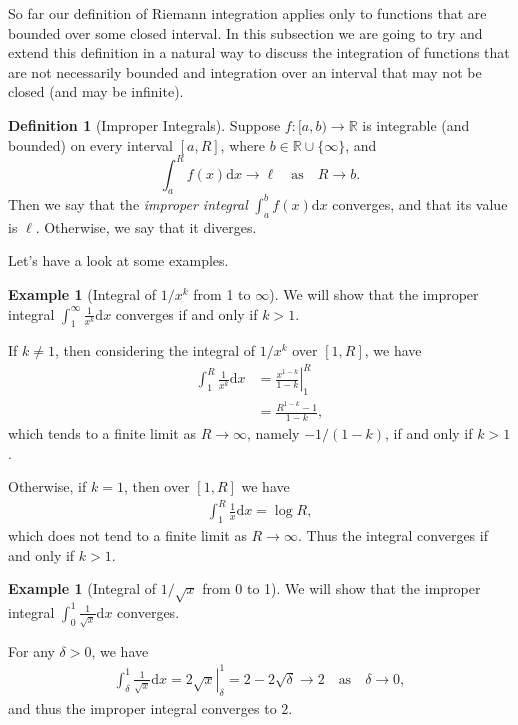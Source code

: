 \documentclass[11pt, a4paper]{article}
\theoremstyle{definition}
\newtheorem{definition}[theorem]{Definition}
\newtheorem{example}[theorem]{Example}
\newcommand{\vocab}[1]{\emph{#1}} %
\newcommand{\R}{\mathbb{R}}
\newcommand{\dd}{\mathrm{d}}
\begin{document}
So far our definition of Riemann integration applies only to functions that are bounded over some closed interval. In this subsection we are going to try and extend this definition in a natural way to discuss the integration of functions that are not necessarily bounded and integration over an interval that may not be closed (and may be infinite).

\begin{definition}[Improper Integrals]
	Suppose $f:[a, b) \rightarrow \R$ is integrable (and bounded) on every interval $[a, R]$, where $b \in \R \cup \{\infty\}$, and
	$$
	\int_a^R f(x) \dd x \rightarrow \ell \quad \text{as} \quad R \rightarrow b.
	$$
	Then we say that the \vocab{improper integral} $\int_a^{b} f(x) \dd x$ converges, and that its value is $\ell$. Otherwise, we say that it diverges. 
\end{definition}

Let's have a look at some examples.

\begin{example}[Integral of $1/x^k$ from 1 to $\infty$]
	We will show that the improper integral
	$
	\displaystyle\int_1^{\infty} \frac{1}{x^k} \dd x
	$
	converges if and only if $k > 1$.

	If $k \neq 1$, then considering the integral of $1/x^k$ over $[1, R]$, we have
	\begin{align*}
	\int_1^R \frac{1}{x^k} \dd x &= \left.\frac{x^{1 - k}}{1 - k}\right|_1^R \\
	&= \frac{R^{1 - k} - 1}{1 - k},
	\end{align*}
	which tends to a finite limit as $R \rightarrow \infty$, namely $-1/(1 - k)$, if and only if $k > 1$.

	Otherwise, if $k = 1$, then over $[1 , R]$ we have
	\begin{align*}
		\int_1^R \frac{1}{x} \dd x = \log R,
	\end{align*}
	which does not tend to a finite limit as $R \rightarrow \infty$.
	Thus the integral converges if and only if $k > 1$.
\end{example}

\begin{example}[Integral of $1/\sqrt{x}$ from 0 to 1]
	We will show that the improper integral
	$\displaystyle \int_0^1 \frac{1}{\sqrt{x}} \dd x$ converges.

	For any $\delta > 0$, we have 
	\begin{align*}
		\int_\delta^1 \frac{1}{\sqrt{x}} \dd x = \left. 2\sqrt{x} \right|_\delta^1 = 2 - 2\sqrt{\delta} \rightarrow 2 \quad \text{as} \quad \delta \rightarrow 0,
	\end{align*}
	and thus the improper integral converges to $2$.
\end{example}
\end{document}
